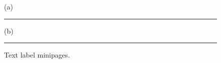 \documentclass{article}
\begin{document}
\begin{figure}
\begin{minipage}{0.04\textwidth}(a)\end{minipage}
\begin{minipage}{0.9\textwidth}\rule{\linewidth}{2cm}\end{minipage}

\begin{minipage}{0.04\textwidth}(b)\end{minipage}
\begin{minipage}{0.9\textwidth}\rule{\linewidth}{2cm}\end{minipage}
\caption{Text label minipages.}
\end{figure}
\end{document}
